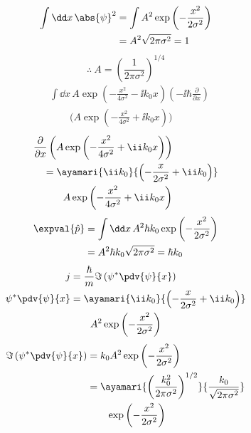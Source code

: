 \begin{align*}
\int\dd x\,\abs{\psi}^{2}&=\int A^{2}\exp\left(-\frac{x^{2}}{2\sigma^{2}}\right)\\
&=A^{2}\sqrt{2\pi\sigma^{2}}=1
\end{align*}
\[ \therefore\ A=\left(\frac{1}{2\pi\sigma^{2}}\right)^{1/4} \]
\begin{align*}
&\int\dd x\,A\exp\left(-\frac{x^{2}}{4\sigma^{2}}-\ii k_{0}x\right)\left(-\ii\hbar\frac{\partial}{\partial x}\right)\\
&\qquad\biggl(A\exp\left(-\frac{x^{2}}{4\sigma^{2}}+\ii k_{0}x\right)\biggr)
\end{align*}
\begin{align*}
&\frac{\partial}{\partial x}\left(A\exp\left(-\frac{x^{2}}{4\sigma^{2}}+\ii k_{0}x\right)\right)\\
&\quad=\ayamari{\ii k_{0}}{\left(-\frac{x}{2\sigma^{2}}+\ii k_{0}\right)}\\
&\qquad\quad A\exp\left(-\frac{x^{2}}{4\sigma^{2}}+\ii k_{0}x\right)
\end{align*}
\begin{align*}
\expval{\hat{p}}&=\int\dd x\,A^{2}\hbar k_{0}\exp\left(-\frac{x^{2}}{2\sigma^{2}}\right)\\
&=A^{2}\hbar k_{0}\sqrt{2\pi\sigma^{2}}=\hbar k_{0}
\end{align*}
\begin{align*}
j&=\frac{\hbar}{m}\Im\left(\psi^{*}\pdv{\psi}{x}\right)\\
\psi^{*}\pdv{\psi}{x}&=\ayamari{\ii k_{0}}{\left(-\frac{x}{2\sigma^{2}}+\ii k_{0}\right)}\\
&\qquad A^{2}\exp\left(-\frac{x^{2}}{2\sigma^{2}}\right)
\end{align*}
\begin{align*}
\Im\left(\psi^{*}\pdv{\psi}{x}\right)&=k_{0}A^{2}\exp\left(-\frac{x^{2}}{2\sigma^{2}}\right)\\
&=\ayamari{\left(\frac{k_{0}^{2}}{2\pi\sigma^{2}}\right)^{1/2}}{\frac{k_{0}}{\sqrt{2\pi\sigma^{2}}}}\\
&\qquad\exp\left(-\frac{x^{2}}{2\sigma^{2}}\right)
\end{align*}
